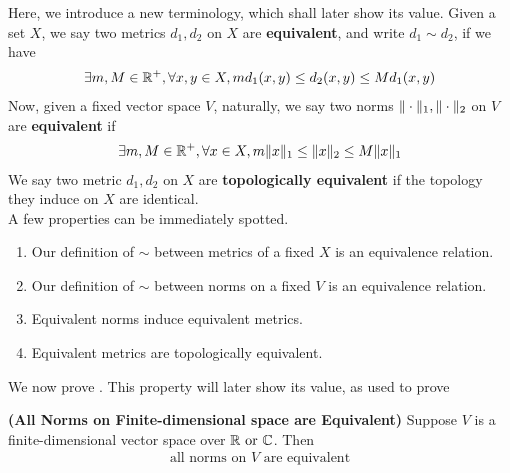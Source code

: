 \documentclass{report}
\begin{document}
\begin{mdframed}
Here, we introduce a new terminology, which shall later show its value. Given a set $X$, we say two metrics $d_1,d_2$ on $X$ are \textbf{equivalent}, and write $d_1\sim d_2$, if we have 
\begin{align*}
\exists m,M \in\mathbb{R}^+, \forall x ,y\in X, md_1(x,y)\leq d_2(x,y) \leq Md_1(x,y)
\end{align*}
Now, given a fixed vector space $V$, naturally, we say two norms $\| \cdot \|_1,\| \cdot \|_2$ on $V$ are \textbf{equivalent} if 
\begin{align*}
\exists m,M \in\mathbb{R}^+, \forall x\in X, m \| x \|_1\leq \| x \|_2 \leq M\| x \|_1
\end{align*}
We say two metric $d_1,d_2$ on  $X$ are  \textbf{topologically equivalent} if the topology they induce on $X$ are identical.\\

A few properties can be immediately spotted.  
\begin{enumerate}[label=(\alph*)]
  \item Our definition of $\sim$ between metrics of a fixed $X$ is an equivalence relation.
  \item Our definition of $\sim$ between norms on a fixed $V$ is an equivalence relation.
  \item Equivalent norms induce equivalent metrics.
  \item Equivalent metrics are topologically equivalent. 
\end{enumerate}

We now prove . This property will later show its value, as used to prove  
\end{mdframed}
\begin{theorem}
\label{ANoF}
\textbf{(All Norms on Finite-dimensional space are Equivalent)} Suppose $V$ is a finite-dimensional vector space over $\mathbb{R}\text{ or }\mathbb{C}$. Then 
\begin{align*}
\text{ all norms on $V$ are equivalent }
\end{align*}
\end{theorem}
\end{document}

